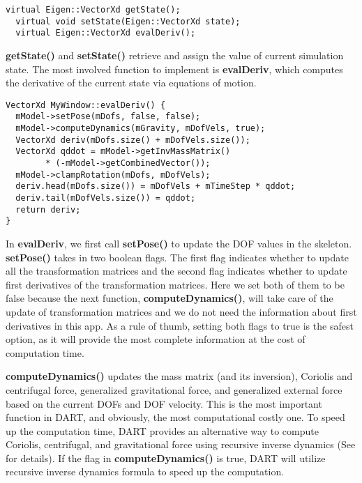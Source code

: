 \ttfamily
\begin{lstlisting}[caption=MyWindow.h]
  virtual Eigen::VectorXd getState();
  virtual void setState(Eigen::VectorXd state);	
  virtual Eigen::VectorXd evalDeriv();
\end{lstlisting}
\rmfamily 

\textbf{getState()} and \textbf{setState()} retrieve and
assign the value of current simulation state. The most involved
function to implement is \textbf{evalDeriv}, which computes the
derivative of the current state via equations of motion.

\ttfamily
\begin{lstlisting}[caption=MyWindows.cpp]
VectorXd MyWindow::evalDeriv() {
  mModel->setPose(mDofs, false, false);
  mModel->computeDynamics(mGravity, mDofVels, true);
  VectorXd deriv(mDofs.size() + mDofVels.size());
  VectorXd qddot = mModel->getInvMassMatrix() 
        * (-mModel->getCombinedVector());
  mModel->clampRotation(mDofs, mDofVels);
  deriv.head(mDofs.size()) = mDofVels + mTimeStep * qddot;
  deriv.tail(mDofVels.size()) = qddot;
  return deriv;
}
\end{lstlisting}
\rmfamily
In \textbf{evalDeriv}, we first call \textbf{setPose()} to update the
DOF values in the skeleton. \textbf{setPose()} takes in two boolean
flags. The first flag indicates whether to update all the
transformation matrices and the second flag indicates whether to
update first derivatives of the transformation matrices. Here we set
both of them to be false because the next function, 
\textbf{computeDynamics()}, will take care of the update of
transformation matrices and we do not need the information about first
derivatives in this app. As a rule of thumb, setting both flags to
true is the safest option, as it will provide the most complete
information at the cost of computation time.

\textbf{computeDynamics()} updates the mass matrix (and its
inversion), Coriolis and centrifugal force, generalized gravitational force,
and generalized external force based on the current DOFs and DOF
velocity. This is the most important function in DART, and obviously,
the most computational costly one. To speed up the computation time,
DART provides an alternative way to compute Coriolis, centrifugal, and
gravitational force using recursive inverse dynamics (See
\cite{dynamics-tutorial} for details). If the flag in
\textbf{computeDynamics()} is true, DART will utilize recursive
inverse dynamics formula to speed up the computation.

